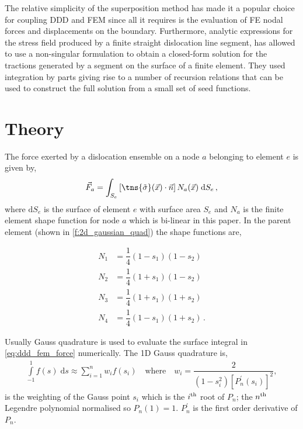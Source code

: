 \documentclass[11pt]{iopart}
\begin{document}
The relative simplicity of the superposition method has made it a popular choice for coupling DDD and FEM since all it requires is the evaluation of FE nodal forces and displacements on the boundary. Furthermore, analytic expressions for the stress field produced by a finite straight dislocation line segment, has allowed \citet{Queyreau} to use a non-singular formulation to obtain a closed-form solution for the tractions generated by a segment on the surface of a finite element. They used integration by parts giving rise to a number of recursion relations that can be used to construct the full solution from a small set of seed functions.

\section{Theory}\label{s:theory}

The force exerted by a dislocation ensemble on a node $a$ belonging to element $e$ is given by,
%
\begin{align}
    \vec{F}_{a} = \int_{S_{e}} \left[\tns{\tilde{\sigma}}(\vec{x}) \cdot \vec{n}\right] N_{a}(\vec{x})\; \mathrm{d}S_{e}\,,
    \label{eq:ddd_fem_force}
\end{align}
%
where $\mathrm{d}S_{e}$ is the surface of element $e$ with surface area $S_{e}$ and $N_{a}$ is the finite element shape function for node $a$ which is bi-linear in this paper. In the parent element (shown in \cref{f:2d_gaussian_quad}) the shape functions are,

\begin{align}
    \label{eq:shape_function}
    N_{1} & = \dfrac{1}{4}(1-s_1)(1-s_2)             \\
    N_{2} & = \dfrac{1}{4}(1+s_1)(1-s_2)\nonumber    \\
    N_{3} & = \dfrac{1}{4}(1+s_1)(1+s_2)\nonumber    \\
    N_{4} & = \dfrac{1}{4}(1-s_1)(1+s_2)\nonumber\,.
\end{align}

Usually Gauss quadrature is used to evaluate the surface integral in \cref{eq:ddd_fem_force} numerically. The 1D Gauss quadrature is,
%
\begin{align}
    \label{eq:gauss_leg}
    \int\limits_{-1}^{1} f(s)\;\mathrm{d}s \approx \sum\limits_{i=1}^{n} w_{i} f(s_{i}) \quad \textrm{where}\quad
    w_{i} = \dfrac{2}{\left(1-s_{i}^{2}\right) \left[P_{n}^{'}\left(s_{i}\right)\right]^{2}},
\end{align}
%
is the weighting of the Gauss point $s_{i}$ which is the $i\textsuperscript{th}$ root of $P_{n}$; the $n\textsuperscript{th}$ Legendre polynomial normalised so $P_{n}(1) = 1$. $P_{n}^{'}$ is the first order derivative of $P_{n}$.
\end{document}

